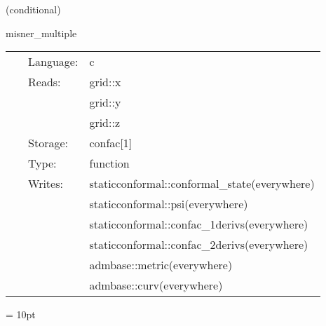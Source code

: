 \documentclass{article}
\begin{document}
\vspace{5mm}

   (conditional) 

\hspace{5mm} misner\_multiple 

\hspace{5mm}{\it construct initial data for multiple misner black holes } 


\hspace{5mm}

 \begin{tabular*}{160mm}{cll} 
~ & Language:  & c \\ 
~ & Reads:  & grid::x \\ 
~& ~ &grid::y\\ 
~& ~ &grid::z\\ 
~ & Storage:  & confac[1] \\ 
~ & Type:  & function \\ 
~ & Writes:  & staticconformal::conformal\_state(everywhere) \\ 
~& ~ &staticconformal::psi(everywhere)\\ 
~& ~ &staticconformal::confac\_1derivs(everywhere)\\ 
~& ~ &staticconformal::confac\_2derivs(everywhere)\\ 
~& ~ &admbase::metric(everywhere)\\ 
~& ~ &admbase::curv(everywhere)\\ 
\end{tabular*} 



\vspace{5mm}\parskip = 10pt 
\end{document}
